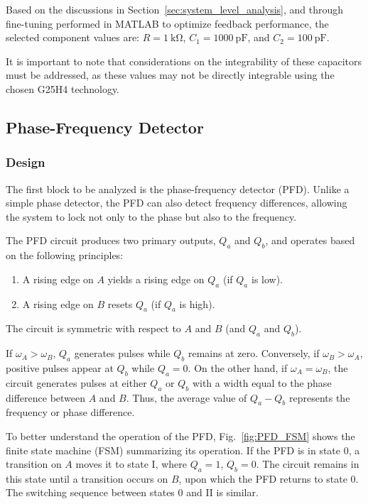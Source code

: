 \documentclass[lettersize,journal]{IEEEtran}
\begin{document}
Based on the discussions in Section~\ref{sec:system_level_analysis}, and through fine-tuning performed in MATLAB to optimize feedback performance, the selected component values are: \( R = 1~\mathrm{k\Omega} \), \( C_1 = 1000~\mathrm{pF} \), and \( C_2 = 100~\mathrm{pF} \).

It is important to note that considerations on the integrability of these capacitors must be addressed, as these values may not be directly integrable using the chosen G25H4 technology.

\subsection{Phase-Frequency Detector}

\subsubsection{Design}
The first block to be analyzed is the phase-frequency detector (PFD). Unlike a simple phase detector, the PFD can also detect frequency differences, allowing the system to lock not only to the phase but also to the frequency. 

The PFD circuit produces two primary outputs, \( Q_a \) and \( Q_b \), and operates based on the following principles:
\begin{enumerate}
    \item A rising edge on \( A \) yields a rising edge on \( Q_a \) (if \( Q_a \) is low).
    \item A rising edge on \( B \) resets \( Q_a \) (if \( Q_a \) is high).
\end{enumerate}
The circuit is symmetric with respect to \( A \) and \( B \) (and \( Q_a \) and \( Q_b \)). 

If \( \omega_A > \omega_B \), \( Q_a \) generates pulses while \( Q_b \) remains at zero. Conversely, if \( \omega_B > \omega_A \), positive pulses appear at \( Q_b \) while \( Q_a = 0 \). On the other hand, if \( \omega_A = \omega_B \), the circuit generates pulses at either \( Q_a \) or \( Q_b \) with a width equal to the phase difference between \( A \) and \( B \). Thus, the average value of \( Q_a - Q_b \) represents the frequency or phase difference.

To better understand the operation of the PFD, Fig.~\ref{fig:PFD_FSM} shows the finite state machine (FSM) summarizing its operation. If the PFD is in state 0, a transition on \( A \) moves it to state I, where \( Q_a = 1 \), \( Q_b = 0 \). The circuit remains in this state until a transition occurs on \( B \), upon which the PFD returns to state 0. The switching sequence between states 0 and II is similar. 
\end{document}
